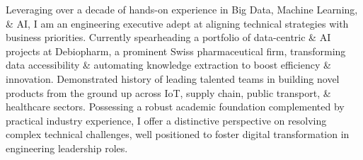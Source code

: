 

\begin{cvparagraph}

Leveraging over a decade of hands-on experience in Big Data, Machine Learning, \& AI, I am an engineering executive adept at aligning technical strategies with business priorities. 
Currently spearheading a portfolio of data-centric \& AI projects at Debiopharm, a prominent Swiss pharmaceutical firm, transforming data accessibility \& automating knowledge extraction to boost efficiency \& innovation. 
Demonstrated history of leading talented teams in building novel products from the ground up across IoT, supply chain, public transport, \& healthcare sectors.
Possessing a robust academic foundation complemented by practical industry experience, I offer a distinctive perspective on resolving complex technical challenges, well positioned to foster digital transformation in engineering leadership roles.
\end{cvparagraph}